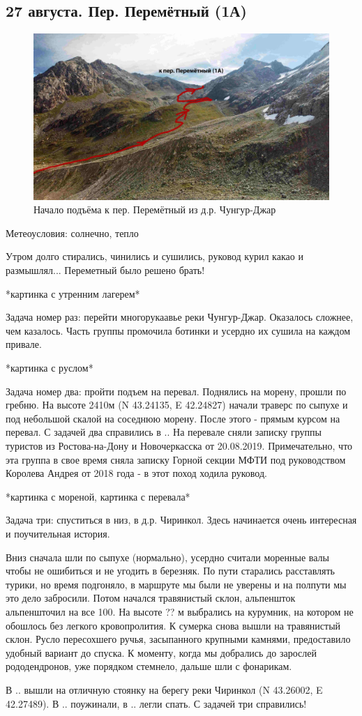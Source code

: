 \subsection{27 августа. Пер. Перемётный (1А)}

\begin{figure}[h!]
	\centering
	\includegraphics[width=0.7\linewidth]{../pics/perem_1}
	\caption{Начало подъёма к пер. Перемётный из д.р. Чунгур-Джар}
	\label{fig:perem_1}
\end{figure}

Метеоусловия: солнечно, тепло

Утром долго стирались, чинились и сушились, руковод курил какао и размышлял... Переметный было решено брать!

*картинка с утренним лагерем*

Задача номер раз: перейти многорукаавье реки Чунгур-Джар. Оказалось сложнее, чем казалось. Часть группы промочила ботинки и усердно их сушила на каждом привале.

*картинка с руслом*

Задача номер два: пройти подъем на перевал. Поднялись на морену, прошли по гребню. На высоте 2410м (N 43.24135, E 42.24827) начали траверс по сыпухе и под небольшой скалой на соседнюю морену. После этого - прямым курсом на перевал. С задачей два справились в ..
На перевале сняли записку группы туристов из Ростова-на-Дону и Новочеркасска от 20.08.2019. Примечательно, что эта группа в свое время сняла записку Горной секции МФТИ под руководством Королева Андрея от 2018 года - в этот поход ходила руковод.

*картинка с мореной, картинка с перевала*

Задача три: спуститься в низ, в д.р. Чиринкол. Здесь начинается очень интересная и поучительная история.

Вниз сначала шли по сыпухе (нормально), усердно считали моренные валы чтобы не ошибиться и не угодить в березняк. По пути старались расставлять турики, но время подгоняло, в маршруте мы были не  уверены и на полпути мы это дело забросили.  Потом начался травянистый склон, альпеншток альпеншточил на все 100. На высоте ?? м выбрались на курумник, на котором не обошлось без легкого кровопролития. К сумерка снова вышли на травянистый склон. Русло пересохшего ручья, засыпанного крупными камнями, предоставило удобный вариант до спуска. К моменту, когда мы добрались до зарослей рододендронов, уже порядком стемнело, дальше шли с фонарикам. 

В .. вышли на отличную стоянку на берегу реки Чиринкол (N 43.26002, E 42.27489). В .. поужинали, в .. легли спать. С задачей три справились!



\newpage